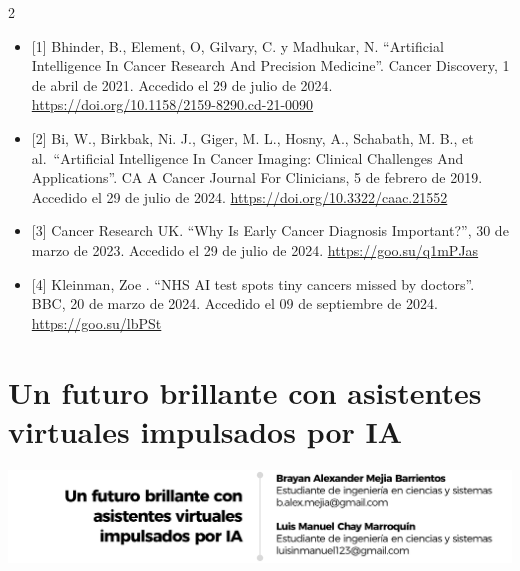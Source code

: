 \documentclass[12pt,spanish,Letterpaper,openany]{book}
\begin{document}
\begin {multicols}{2}
\begin{itemize}
\item
  {[}1{]} Bhinder, B., Element, O, Gilvary, C. y Madhukar, N. ``Artificial Intelligence In Cancer Research And Precision Medicine''. Cancer Discovery, 1 de abril de 2021. Accedido el 29 de julio de 2024. \url{https://doi.org/10.1158/2159-8290.cd-21-0090}
\item
  {[}2{]} Bi, W., Birkbak, Ni. J., Giger, M. L., Hosny, A., Schabath, M. B., et al.~``Artificial Intelligence In Cancer Imaging: Clinical Challenges And Applications''. CA A Cancer Journal For Clinicians, 5 de febrero de 2019. Accedido el 29 de julio de 2024.
  \url{https://doi.org/10.3322/caac.21552}
\item
  {[}3{]} Cancer Research UK. ``Why Is Early Cancer Diagnosis Important?'', 30 de marzo de 2023. Accedido el 29 de julio de 2024.
  \url{https://goo.su/q1mPJas}
\item
  {[}4{]} Kleinman, Zoe . ``NHS AI test spots tiny cancers missed by doctors''. BBC, 20 de marzo de 2024. Accedido el 09 de septiembre de 2024.
  \url{https://goo.su/lbPSt}
\end{itemize}

\end {multicols}

\medskip

\hypertarget{pareja62}{%
\chapter{Un futuro brillante con asistentes virtuales impulsados por IA}\label{pareja62}}

\begin{center}\includegraphics[width=1\linewidth]{autores/pareja62_01} \end{center}
\end{document}
